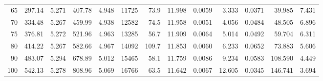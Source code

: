 \documentclass[10pt]{article}
\begin{document}
{\begin{tabular}{|r|rr|rr|rr|rr|rr|r|r|}
       65 &       297.14 &        5.271 &       407.78 &        4.948 &        11725 &         73.9 &       11.998 &       0.0059 &        3.333 &       0.0371 &       39.985 &        7.431 \\
       70 &       334.48 &        5.267 &       459.99 &        4.938 &        12582 &         74.5 &       11.958 &       0.0051 &        4.056 &       0.0484 &       48.505 &        6.896 \\
       75 &       376.81 &        5.272 &       521.96 &        4.963 &        13285 &         56.7 &       11.909 &       0.0064 &        5.014 &       0.0492 &       59.704 &        6.311 \\
       80 &       414.22 &        5.267 &       582.66 &        4.967 &        14092 &        109.7 &       11.853 &       0.0060 &        6.233 &       0.0652 &       73.883 &        5.606 \\
       90 &       483.07 &        5.294 &       678.89 &        5.012 &        15465 &         58.1 &       11.759 &       0.0086 &        9.234 &       0.0583 &      108.590 &        4.449 \\
      100 &       542.13 &        5.278 &       808.96 &        5.069 &        16766 &         63.5 &       11.642 &       0.0067 &       12.605 &       0.0345 &      146.741 &        3.694 \\
\hline
\end{tabular}
}







\pagebreak
\end{document}
